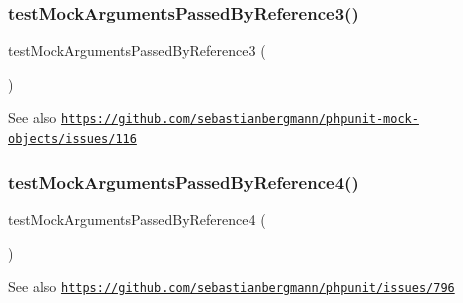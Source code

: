 \subsubsection{\texorpdfstring{test\+Mock\+Arguments\+Passed\+By\+Reference3()}{testMockArgumentsPassedByReference3()}}
{\footnotesize\ttfamily test\+Mock\+Arguments\+Passed\+By\+Reference3 (\begin{DoxyParamCaption}{ }\end{DoxyParamCaption})}

\begin{DoxySeeAlso}{See also}
\href{https://github.com/sebastianbergmann/phpunit-mock-objects/issues/116}{\tt https\+://github.\+com/sebastianbergmann/phpunit-\/mock-\/objects/issues/116} 
\end{DoxySeeAlso}
\mbox{\label{class_framework___mock_object_test_ab26370fce4c589ca891b4a7d06eb4b24}} 
\subsubsection{\texorpdfstring{test\+Mock\+Arguments\+Passed\+By\+Reference4()}{testMockArgumentsPassedByReference4()}}
{\footnotesize\ttfamily test\+Mock\+Arguments\+Passed\+By\+Reference4 (\begin{DoxyParamCaption}{ }\end{DoxyParamCaption})}

\begin{DoxySeeAlso}{See also}
\href{https://github.com/sebastianbergmann/phpunit/issues/796}{\tt https\+://github.\+com/sebastianbergmann/phpunit/issues/796} 
\end{DoxySeeAlso}
\mbox{\label{class_framework___mock_object_test_a2fb7dc109dd2efae9df37fc231ed2bf8}} 
